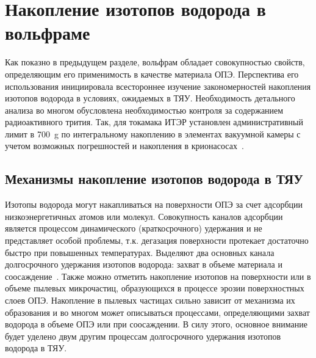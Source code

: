\section{Накопление изотопов водорода в вольфраме}

Как показно в предыдущем разделе, вольфрам обладает совокупностью свойств, определяющим его применимость в качестве материала ОПЭ. Перспектива его использования инициировала всестороннее изучение закономерностей накопления изотопов водорода в условиях, ожидаемых в ТЯУ. Необходимость детального анализа во многом обусловлена необходимостью контроля за содержанием радиоактивного трития. Так, для токамака ИТЭР установлен административный лимит в \SI{700}{\gram} по интегральному накоплению в элементах вакуумной камеры с учетом возможных погрешностей и накопления в крионасосах~\cite{Roth1}.

\subsection{Механизмы накопление изотопов водорода в ТЯУ}

Изотопы водорода могут накапливаться на поверхности ОПЭ за счет адсорбции низкоэнергетичных атомов или молекул. Совокупность каналов адсорбции является процессом динамического (краткосрочного) удержания и не представляет особой проблемы, т.к. дегазация поверхности протекает достаточно быстро при повышенных температурах. Выделяют два основных канала долгосрочного удержания изотопов водорода: захват в объеме материала и соосаждение~\cite{Gasparyan2024, Skinner2009}. Также можно отметить накопление изотопов на поверхности или в объеме пылевых микрочастиц, образующихся в процессе эрозии поверхностных слоев ОПЭ. Накопление в пылевых частицах сильно зависит от механизма их образования и во многом может описываться процессами, определяющими захват водорода в объеме ОПЭ или при соосаждении. В силу этого, основное внимание будет уделено двум другим процессам долгосрочного удержания изотопов водорода в ТЯУ.

